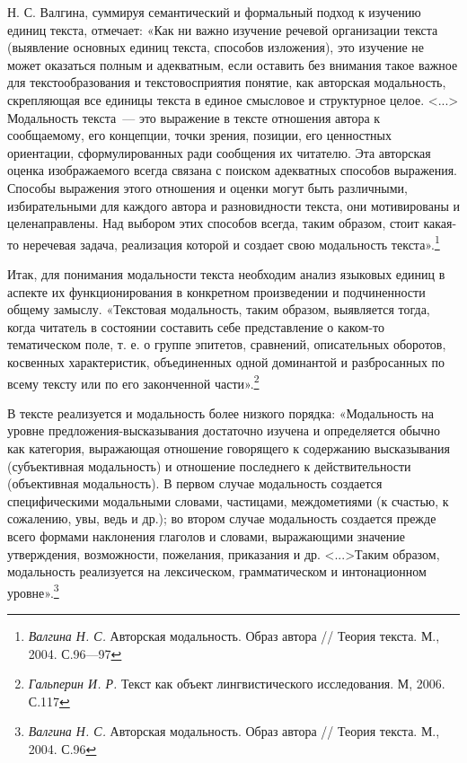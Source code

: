 \documentclass{kursa4}
\begin{document}
{      Н. С. Валгина, суммируя семантический и формальный подход к изучению
      единиц текста, отмечает: «Как ни важно изучение речевой организации
      текста (выявление основных единиц текста, способов изложения), это
      изучение не может оказаться полным и адекватным, если оставить без
      внимания такое важное для текстообразования и текстовосприятия понятие,
      как авторская модальность, скрепляющая все единицы текста в единое
      смысловое и структурное целое. \textless{}...\textgreater{} Модальность
      текста~--- это выражение в тексте отношения автора к сообщаемому, его
      концепции, точки зрения, позиции, его ценностных ориентации,
      сформулированных ради сообщения их читателю. Эта авторская оценка
      изображаемого всегда связана с поиском адекватных способов выражения.
      Способы выражения этого отношения и оценки могут быть различными,
      избирательными для каждого автора и разновидности текста, они
      мотивированы и целенаправлены. Над выбором этих способов всегда, таким
      образом, стоит какая-то неречевая задача, реализация которой и создает
      свою модальность текста».\footnote{\textit{{Валгина Н.
      С. }}{Авторская модальность. Образ автора // Теория текста. М., 2004. С.96—97}} 

      Итак, для понимания модальности текста необходим анализ языковых
      единиц в аспекте их функционирования в конкретном произведении и
      подчиненности общему замыслу. «{Текстовая модальность,
      таким образом, выявляется тогда, когда читатель в состоянии составить
      себе представление о каком-то тематическом поле, т. е. о группе
      эпитетов, сравнений, описательных оборотов, косвенных характеристик,
      объединенных одной доминантой и разбросанных по всему тексту или по его
      законченной части».}\footnote{\textit{{Гальперин И. Р.
      }}{Текст как объект лингвистического исследования. М,
      2006. С.117}}{ }

      В тексте реализуется и модальность более низкого порядка:
      «Модальность на уровне предложения-высказывания достаточно изучена и
      определяется обычно как категория, выражающая отношение говорящего к
      содержанию высказывания (субъективная модальность) и отношение
      последнего к действительности (объективная модальность). В первом
      случае модальность создается специфическими модальными словами,
      частицами, междометиями (к счастью, к сожалению, увы, ведь и др.); во
      втором случае модальность создается прежде всего формами наклонения
      глаголов и словами, выражающими значение утверждения, возможности,
      пожелания, приказания и др. \textless{}...\textgreater{}Таким образом,
      модальность реализуется на лексическом, грамматическом и интонационном
      уровне».\footnote{\textit{{Валгина Н. С.
      }}{Авторская модальность. Образ автора // Теория текста. М., 2004. С.96}} 

}
\end{document}
